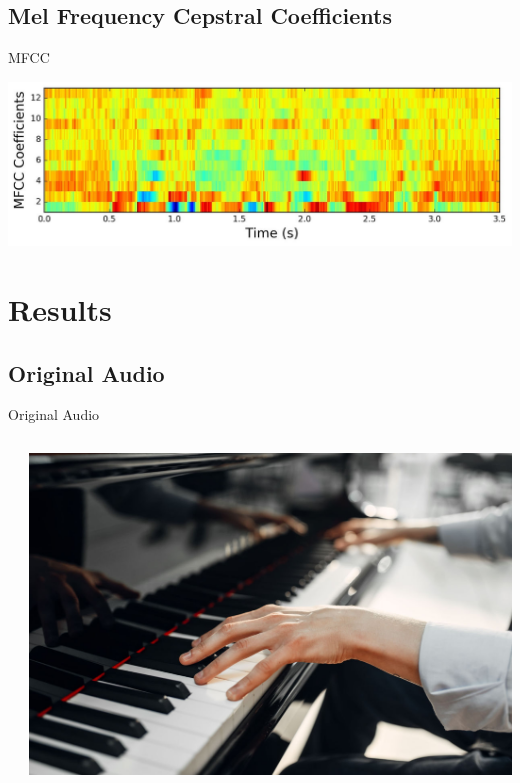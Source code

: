 \documentclass[aspectratio=169, 11pt]{beamer}
\begin{document}
\subsection{Mel Frequency Cepstral Coefficients}

\begin{frame}{MFCC}
  \begin{center}
    \includegraphics[width=\textwidth]{image/mfcc.jpg}
  \end{center}
\end{frame}

\section{Results}

\subsection{Original Audio}

\begin{frame}{Original Audio}
  \begin{columns}
    \begin{column}{0.5\textwidth}
      \centering
    \end{column}
    \begin{column}{0.5\textwidth}
      \includegraphics[width=\textwidth]{image/piano.png}
    \end{column}
  \end{columns}
\end{frame}
\end{document}

